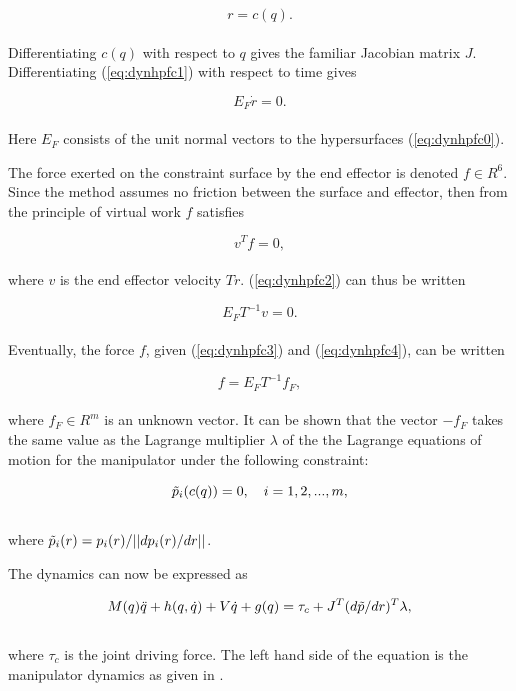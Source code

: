 \begin{equation}\label{eq:dynhpfc1}
    r = c(q).
\end{equation}
\\
Differentiating $c(q)$ with respect to $q$ gives the familiar Jacobian matrix $J$.
Differentiating (\ref{eq:dynhpfc1}) with respect to time gives

\begin{equation}\label{eq:dynhpfc2}
    E_F \dot{r} = 0.
\end{equation}
\\
Here $E_F$ consists of the unit normal vectors to the hypersurfaces (\ref{eq:dynhpfc0}).

The force exerted on the constraint surface by the end effector is denoted $f \in R^6$. Since the method assumes no friction between the surface and effector, then from the principle of virtual work $f$ satisfies

\begin{equation}\label{eq:dynhpfc3}
    v^T f = 0,
\end{equation}
\\
where $v$ is the end effector velocity $T\dot{r}$. (\ref{eq:dynhpfc2}) can thus be written

\begin{equation}\label{eq:dynhpfc4}
    E_F T^{-1} v = 0.    
\end{equation}
\\
Eventually, the force $f$, given (\ref{eq:dynhpfc3}) and (\ref{eq:dynhpfc4}), can be written 

\begin{equation}
    f = E_F T^{-1} f_F,
\end{equation}
\\
where $f_F \in R^m$ is an unknown vector. It can be shown that the vector $-f_F$ takes the same value as the Lagrange multiplier $\lambda$ of the the Lagrange equations of motion for the manipulator under the following constraint:

\begin{equation}
    \Tilde{p}_i(c(q)) = 0, \quad i = 1, 2, ..., m,
\end{equation}
\\
where $\Tilde{p}_i(r) = p_i(r)/||dp_i(r)/dr||$.

The dynamics can now be expressed as

\begin{equation}
    M(q)\ddot{q} + h(q,\dot{q}) + V\dot{q} + g(q) = \tau_c + J^T(d\Tilde{p}/dr)^T \lambda,
\end{equation}
\\
where $\tau_c$ is the joint driving force. The left hand side of the equation is the manipulator dynamics as given in \cite{yoshikawa1987dynamic}.

